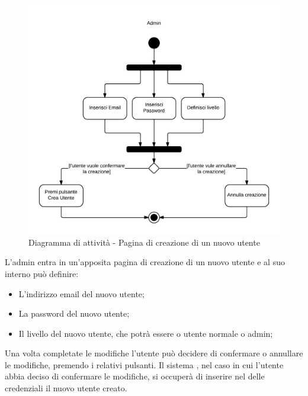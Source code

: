 \begin{figure}[H]
\centering
\includegraphics[scale=0.2]{uml/MaaP - Crea nuovo utente.png}
\caption{Diagramma di attività - Pagina di creazione di un nuovo utente}
\end{figure}

L'admin entra in un'apposita pagina di creazione di un nuovo utente e al suo interno può definire:

\begin{itemize}

	\item L'indirizzo email del nuovo utente;
	\item La password del nuovo utente;
	\item Il livello del nuovo utente, che potrà essere o utente normale o admin;

\end{itemize}

Una volta completate le modifiche l'utente può decidere di confermare o annullare le modifiche, premendo i relativi pulsanti. Il sistema , nel caso in cui l'utente abbia deciso di confermare le modifiche, si occuperà di inserire nel  delle credenziali il nuovo utente creato.

